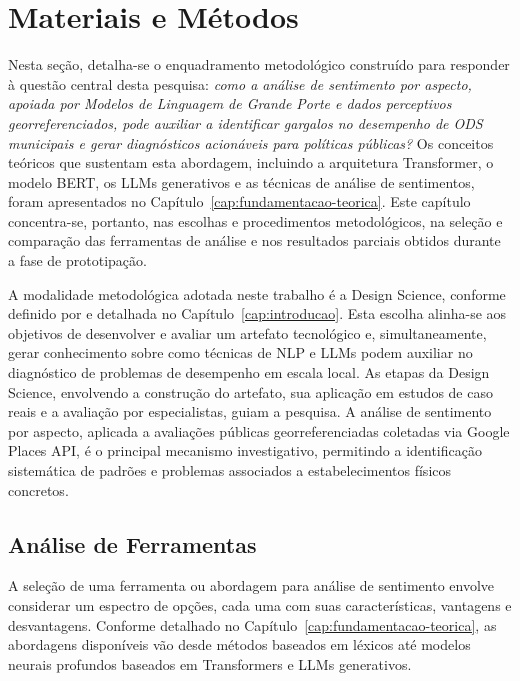 \chapter{Materiais e Métodos}
\label{cap:materiais-metodos}

Nesta seção, detalha-se o enquadramento metodológico construído para
responder à questão central desta pesquisa: \emph{como a análise de
sentimento por aspecto, apoiada por Modelos de Linguagem de Grande Porte e
dados perceptivos georreferenciados, pode auxiliar a identificar gargalos
no desempenho de ODS municipais e gerar diagnósticos acionáveis para
políticas públicas?} Os conceitos teóricos que sustentam esta abordagem, incluindo a arquitetura Transformer, o modelo \gls{BERT}, os \gls{LLM}s
generativos e as técnicas de análise de sentimentos, foram apresentados
no Capítulo~\ref{cap:fundamentacao-teorica}. Este capítulo concentra-se,
portanto, nas escolhas e procedimentos metodológicos, na seleção e
comparação das ferramentas de análise e nos resultados parciais obtidos
durante a fase de prototipação.

A modalidade metodológica adotada neste trabalho é a Design Science,
conforme definido por \citeauthor{wieringa2014} \citeyear{wieringa2014} e
detalhada no Capítulo~\ref{cap:introducao}. Esta escolha alinha-se aos
objetivos de desenvolver e avaliar um artefato tecnológico e, simultaneamente, gerar
conhecimento sobre como técnicas de \gls{NLP} e \gls{LLM}s podem auxiliar
no diagnóstico de problemas de desempenho em escala local. As etapas da
Design Science, envolvendo a construção do artefato, sua aplicação em
estudos de caso reais e a avaliação por especialistas, guiam a pesquisa. A
análise de sentimento por aspecto, aplicada a avaliações públicas
georreferenciadas coletadas via Google Places API, é o principal mecanismo
investigativo, permitindo a identificação sistemática de padrões e
problemas associados a estabelecimentos físicos concretos.

\section{Análise de Ferramentas}
\label{sec:analise-ferramentas}

A seleção de uma ferramenta ou abordagem para análise de sentimento
envolve considerar um espectro de opções, cada uma com suas características,
vantagens e desvantagens. Conforme detalhado no
Capítulo~\ref{cap:fundamentacao-teorica}, as abordagens disponíveis vão
desde métodos baseados em léxicos até modelos neurais profundos baseados em
Transformers e LLMs generativos.


